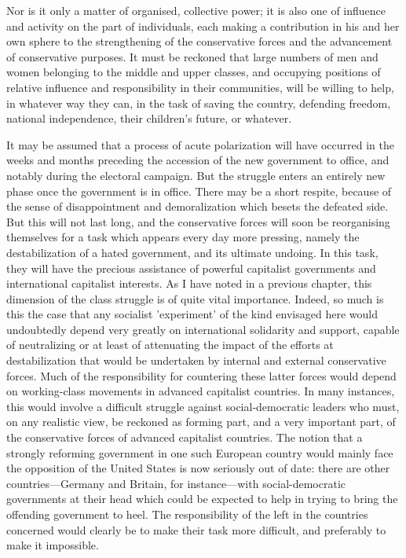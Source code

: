 Nor is it only a matter of organised, collective power; it is also one of influence and activity on the part of individuals, each making a contribution in his and her own sphere to the strengthening of the conservative forces and the advancement of conservative purposes. It must be reckoned that large numbers of men and women belonging to the middle and upper classes, and occupying positions of relative influence and responsibility in their communities, will be willing to help, in whatever way they can, in the task of saving the country, defending freedom, national independence, their children's future, or whatever.

It may be assumed that a process of acute polarization will have occurred in the weeks and months preceding the accession of the new government to office, and notably during the electoral campaign. But the struggle enters an entirely new phase once the government is in office. There may be a short respite, because of the sense of disappointment and demoralization which besets the defeated side. But this will not last long, and the conservative forces will soon be reorganising themselves for a task which appears every day more pressing, namely the destabilization of a hated government, and its ultimate undoing. In this task, they will have the precious assistance of powerful capitalist governments and international capitalist interests. As I have noted in a previous chapter, this dimension of the class struggle is of quite vital importance. Indeed, so much is this the case that any socialist 'experiment' of the kind envisaged here would undoubtedly depend very greatly on international solidarity and support, capable of neutralizing or at least of attenuating the impact of the efforts at destabilization that would be undertaken by internal and external conservative forces. Much of the responsibility for countering these latter forces would depend on working-class movements in advanced capitalist countries. In many instances, this would involve a difficult struggle against social-democratic leaders who must, on any realistic view, be reckoned as forming part, and a very important part, of the conservative forces of advanced capitalist countries. The notion that a strongly reforming government in one such European country would mainly face the opposition of the United States is now seriously out of date: there are other countries—Germany and Britain, for instance—with social\hyp{}democratic governments at their head which could be expected to help in trying to bring the offending government to heel. The responsibility of the left in the countries concerned would clearly be to make their task more difficult, and preferably to make it impossible.

